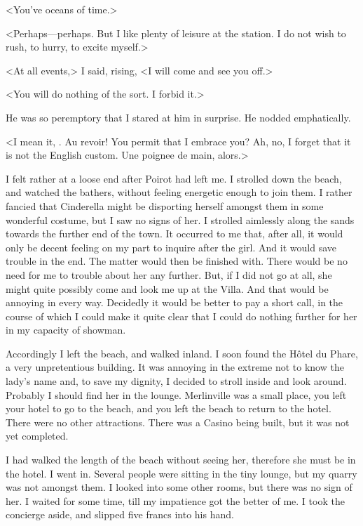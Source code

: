  <You've oceans of time.> 

 <Perhaps—perhaps. But I like plenty of leisure at the station. I do not wish to rush, to hurry, to excite myself.> 

 <At all events,> I said, rising, <I will come and see you off.> 

 <You will do nothing of the sort. I forbid it.> 

 He was so peremptory that I stared at him in surprise. He nodded emphatically. 

 <I mean it, . Au revoir! You permit that I embrace you? Ah, no, I forget that it is not the English custom. Une poignee de main, alors.> 

 I felt rather at a loose end after Poirot had left me. I strolled down the beach, and watched the bathers, without feeling energetic enough to join them. I rather fancied that Cinderella might be disporting herself amongst them in some wonderful costume, but I saw no signs of her. I strolled aimlessly along the sands towards the further end of the town. It occurred to me that, after all, it would only be decent feeling on my part to inquire after the girl. And it would save trouble in the end. The matter would then be finished with. There would be no need for me to trouble about her any further. But, if I did not go at all, she might quite possibly come and look me up at the Villa. And that would be annoying in every way. Decidedly it would be better to pay a short call, in the course of which I could make it quite clear that I could do nothing further for her in my capacity of showman. 

 Accordingly I left the beach, and walked inland. I soon found the Hôtel du Phare, a very unpretentious building. It was annoying in the extreme not to know the lady's name and, to save my dignity, I decided to stroll inside and look around. Probably I should find her in the lounge. Merlinville was a small place, you left your hotel to go to the beach, and you left the beach to return to the hotel. There were no other attractions. There was a Casino being built, but it was not yet completed. 

 I had walked the length of the beach without seeing her, therefore she must be in the hotel. I went in. Several people were sitting in the tiny lounge, but my quarry was not amongst them. I looked into some other rooms, but there was no sign of her. I waited for some time, till my impatience got the better of me. I took the concierge aside, and slipped five francs into his hand. 

